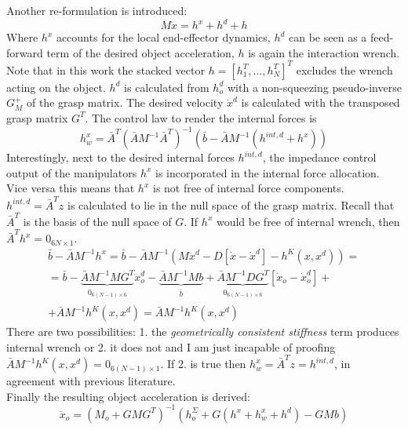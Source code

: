 \documentclass[conference]{IEEEtran}
\begin{document}
Another re-formulation is introduced:
\begin{equation}
M\ddot{x} = h^x + h^d + h
\end{equation}
Where $ h^x $ accounts for the local end-effector dynamics, $ h^d $ can be seen as a feed-forward term of the desired object acceleration, $ h $ is again the interaction wrench. Note that in this work the stacked vector $ h = [h_1^T,...,h_N^T]^T $ excludes the wrench acting on the object. $ h^d $ is calculated from $ h_o^d $ with a non-squeezing pseudo-inverse $ G_M^+ $ of the grasp matrix. The desired velocity $ \dot{x}^d $ is calculated with the transposed grasp matrix $ G^T $.  The control law to render the internal forces is
\begin{equation}
h_w^{x} = \bar{A}^T(\bar{A}M^{-1}\bar{A}^T)^{-1}(\bar{b}-\bar{A}M^{-1}(h^{int,d}+h^x))
\end{equation}
Interestingly, next to the desired internal forces $ h^{int,d} $, the impedance control output of the manipulators $ h^x $ is incorporated in the internal force allocation. Vice versa this means that $ h^x $ is not free of internal force components. $ h^{int,d} = \bar{A}^Tz$ is calculated to lie in the null space of the grasp matrix. Recall that $ \bar{A}^T $ is the basis of the null space of $ G $. If $ h^x $ would be free of internal wrench, then $ \bar{A}^Th^x = 0_{6N\times1} $.
\begin{multline}
\bar{b} - \bar{A}M^{-1}h^x = \bar{b}-\bar{A}M^{-1}(M\ddot{x}^d - D[\dot{x}-\dot{x}^d] - h^K(x,x^d)) =\\
= \bar{b} - \underbrace{\bar{A}M^{-1}MG^T}_{\substack{0_{6(N-1)\times6}}}\ddot{x}_o^d -\underbrace{\bar{A}M^{-1}Mb}_{\substack{\bar{b}}} + \underbrace{\bar{A}M^{-1}DG^T}_{\substack{0_{6(N-1)\times6}}}[\dot{x}_o - \dot{x}_o^d] + \\
+ \bar{A}M^{-1}h^K(x,x^d) = \bar{A}M^{-1}h^K(x,x^d) 
\end{multline}
There are two possibilities: 1. the \textit{geometrically consistent stiffness} term produces internal wrench or 2. it does not and I am just incapable of proofing $ \bar{A}M^{-1}h^K(x,x^d) = 0_{6(N-1)\times1} $. If 2. is true then $ h^x_w = \bar{A}^Tz = h^{int,d} $, in agreement with previous literature.\\
Finally the resulting object acceleration is derived:
\begin{equation}
\ddot{x}_o = (M_o + GMG^T)^{-1}(h_o^{\Sigma} + G(h^x + h_w^x + h^d) - GMb)
\end{equation}
\end{document}
